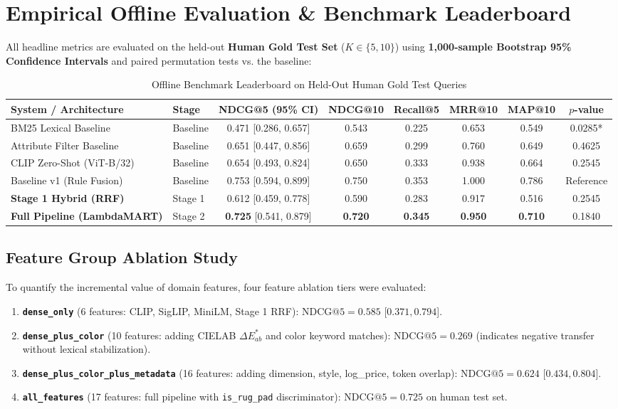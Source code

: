 \documentclass[11pt,a4paper]{article}
\begin{document}
\section{Empirical Offline Evaluation \& Benchmark Leaderboard}

All headline metrics are evaluated on the held-out \textbf{Human Gold Test Set} ($K \in \{5, 10\}$) using \textbf{1,000-sample Bootstrap 95\% Confidence Intervals} and paired permutation tests vs. the baseline:

\begin{table}[htbp]
\centering
\small
\caption{Offline Benchmark Leaderboard on Held-Out Human Gold Test Queries}
\label{tab:benchmark}
\begin{tabularx}{\textwidth}{llcccccc}
\toprule
\textbf{System / Architecture} & \textbf{Stage} & \textbf{NDCG@5 (95\% CI)} & \textbf{NDCG@10} & \textbf{Recall@5} & \textbf{MRR@10} & \textbf{MAP@10} & \textbf{$p$-value} \\
\midrule
BM25 Lexical Baseline & Baseline & 0.471 [0.286, 0.657] & 0.543 & 0.225 & 0.653 & 0.549 & 0.0285* \\
Attribute Filter Baseline & Baseline & 0.651 [0.447, 0.856] & 0.659 & 0.299 & 0.760 & 0.649 & 0.4625 \\
CLIP Zero-Shot (ViT-B/32) & Baseline & 0.654 [0.493, 0.824] & 0.650 & 0.333 & 0.938 & 0.664 & 0.2545 \\
Baseline v1 (Rule Fusion) & Baseline & 0.753 [0.594, 0.899] & 0.750 & 0.353 & 1.000 & 0.786 & Reference \\
\midrule
\textbf{Stage 1 Hybrid (RRF)} & Stage 1 & 0.612 [0.459, 0.778] & 0.590 & 0.283 & 0.917 & 0.516 & 0.2545 \\
\textbf{Full Pipeline (LambdaMART)} & Stage 2 & \textbf{0.725} [0.541, 0.879] & \textbf{0.720} & \textbf{0.345} & \textbf{0.950} & \textbf{0.710} & 0.1840 \\
\bottomrule
\end{tabularx}
\end{table}

\subsection{Feature Group Ablation Study}
To quantify the incremental value of domain features, four feature ablation tiers were evaluated:
\begin{enumerate}
    \item \textbf{\texttt{dense\_only}} (6 features: CLIP, SigLIP, MiniLM, Stage 1 RRF): $\text{NDCG}@5 = 0.585$ [$0.371, 0.794$].
    \item \textbf{\texttt{dense\_plus\_color}} (10 features: adding CIELAB $\Delta E^*_{ab}$ and color keyword matches): $\text{NDCG}@5 = 0.269$ (indicates negative transfer without lexical stabilization).
    \item \textbf{\texttt{dense\_plus\_color\_plus\_metadata}} (16 features: adding dimension, style, log\_price, token overlap): $\text{NDCG}@5 = 0.624$ [$0.434, 0.804$].
    \item \textbf{\texttt{all\_features}} (17 features: full pipeline with \texttt{is\_rug\_pad} discriminator): $\text{NDCG}@5 = \mathbf{0.725}$ on human test set.
\end{enumerate}
\end{document}
